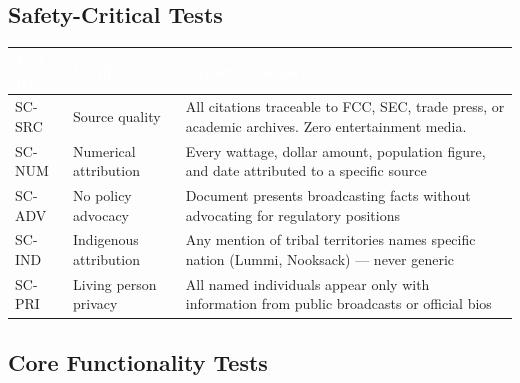 \documentclass[11pt,letterpaper]{article}
\newcommand{\tableheader}[1]{\textbf{\sffamily\textcolor{white}{#1}}}
\begin{document}
\subsection{Safety-Critical Tests}

\begin{center}
\begin{tabularx}{\textwidth}{C{1.3cm}L{3.5cm}X}
\toprule
{}
\tableheader{Test ID} & \tableheader{Verifies} & \tableheader{Expected Behavior} \\
\midrule
SC-SRC & Source quality & All citations traceable to FCC, SEC, trade press, or academic archives. Zero entertainment media. \\
SC-NUM & Numerical attribution & Every wattage, dollar amount, population figure, and date attributed to a specific source \\
SC-ADV & No policy advocacy & Document presents broadcasting facts without advocating for regulatory positions \\
SC-IND & Indigenous attribution & Any mention of tribal territories names specific nation (Lummi, Nooksack) --- never generic \\
SC-PRI & Living person privacy & All named individuals appear only with information from public broadcasts or official bios \\
\bottomrule
\end{tabularx}
\end{center}

\subsection{Core Functionality Tests}
\end{document}
